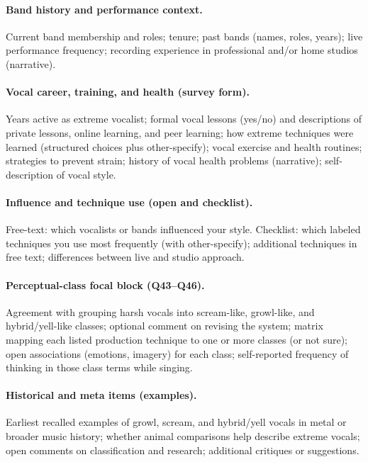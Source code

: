 \paragraph{Band history and performance context.}
Current band membership and roles; tenure; past bands (names, roles, years); live performance frequency; recording experience in professional and/or home studios (narrative).

\paragraph{Vocal career, training, and health (survey form).}
Years active as extreme vocalist; formal vocal lessons (yes/no) and descriptions of private lessons, online learning, and peer learning; how extreme techniques were learned (structured choices plus other-specify); vocal exercise and health routines; strategies to prevent strain; history of vocal health problems (narrative); self-description of vocal style.

\paragraph{Influence and technique use (open and checklist).}
Free-text: which vocalists or bands influenced your style. Checklist: which labeled techniques you use most frequently (with other-specify); additional techniques in free text; differences between live and studio approach.

\paragraph{Perceptual-class focal block (Q43--Q46).}
Agreement with grouping harsh vocals into scream-like, growl-like, and hybrid/yell-like classes; optional comment on revising the system; matrix mapping each listed production technique to one or more classes (or not sure); open associations (emotions, imagery) for each class; self-reported frequency of thinking in those class terms while singing.

\paragraph{Historical and meta items (examples).}
Earliest recalled examples of growl, scream, and hybrid/yell vocals in metal or broader music history; whether animal comparisons help describe extreme vocals; open comments on classification and research; additional critiques or suggestions.
